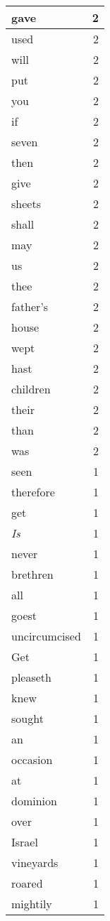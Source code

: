 \begin{center}
\begin{longtable}{l|r}
gave & 2\\ \hline 
used & 2\\ \hline 
will & 2\\ \hline 
put & 2\\ \hline 
you & 2\\ \hline 
if & 2\\ \hline 
seven & 2\\ \hline 
then & 2\\ \hline 
give & 2\\ \hline 
sheets & 2\\ \hline 
shall & 2\\ \hline 
may & 2\\ \hline 
us & 2\\ \hline 
thee & 2\\ \hline 
father's & 2\\ \hline 
house & 2\\ \hline 
wept & 2\\ \hline 
hast & 2\\ \hline 
children & 2\\ \hline 
their & 2\\ \hline 
than & 2\\ \hline 
was & 2\\ \hline 
seen & 1\\ \hline 
therefore & 1\\ \hline 
get & 1\\ \hline 
\emph{Is} & 1\\ \hline 
never & 1\\ \hline 
brethren & 1\\ \hline 
all & 1\\ \hline 
goest & 1\\ \hline 
uncircumcised & 1\\ \hline 
Get & 1\\ \hline 
pleaseth & 1\\ \hline 
knew & 1\\ \hline 
sought & 1\\ \hline 
an & 1\\ \hline 
occasion & 1\\ \hline 
at & 1\\ \hline 
dominion & 1\\ \hline 
over & 1\\ \hline 
Israel & 1\\ \hline 
vineyards & 1\\ \hline 
roared & 1\\ \hline 
mightily & 1\\ \hline 

\end{longtable}
\end{center}
